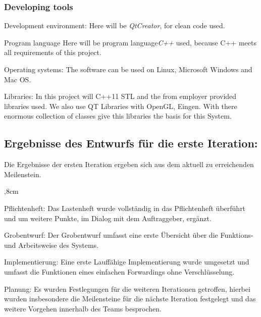 \subsubsection{Developing tools}
	\begin{aims}
		
		\item[Development environment:] Here will be \textit{QtCreator}, for clean code used.
		
		\item[Program language] Here will be program language\textit{C++} used, because C++ meets all requirements of this project.
		
		\item[Operating systems:] The software can be used on Linux, Microsoft Windows and Mac OS.
		
		\item[Libraries:] In this project will C++11 STL and the from employer provided libraries used. 
		We also use QT Libraries with OpenGL, Eingen.
		With there enormous collection of classes  give this libraries the basis for this System. 
		
	\end{aims}

\subsection{Ergebnisse des Entwurfs für die erste Iteration:}
Die Ergebnisse der ersten Iteration ergeben sich aus dem aktuell zu erreichenden Meilenstein.

\begin{aims}
	,8cm
		\item[Pflichtenheft:] Das Lastenheft wurde vollständig in das Pflichtenheft überführt und um weitere Punkte, im Dialog mit dem Auftraggeber, ergänzt.
		
		\item[Grobentwurf:] Der Grobentwurf umfasst eine erste Übersicht über die Funktions- und Arbeitsweise des Systems.
		
		\item[Implementierung:] Eine erste Lauffähige Implementierung wurde umgesetzt und umfasst die Funktionen eines einfachen Forwardings ohne Verschlüsselung.
		
		\item[Planung:] Es wurden Festlegungen für die weiteren Iterationen getroffen, hierbei wurden insbesondere die Meilensteine für die nächste Iteration festgelegt und das weitere Vorgehen innerhalb des Teams besprochen.
		
	\end{aims}

